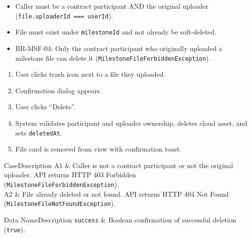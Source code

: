 \begin{itemize}[leftmargin=1.6em,topsep=3pt,itemsep=2pt,parsep=0pt,label=$\bullet$]
      \item Caller must be a contract participant AND the original uploader (\texttt{file.uploaderId === userId}).
      \item File must exist under \texttt{milestoneId} and not already be soft-deleted.
\end{itemize}

\begin{itemize}[leftmargin=1.6em,topsep=3pt,itemsep=2pt,parsep=0pt,label=$\bullet$]\brrulelist
      \item BR-MSF-04: Only the contract participant who originally uploaded a milestone file can delete it (\texttt{MilestoneFileForbiddenException}).
\end{itemize}

\begin{enumerate}[leftmargin=1.8em,topsep=3pt,itemsep=2pt,parsep=0pt]
      \item User clicks trash icon next to a file they uploaded.
      \item Confirmation dialog appears.
      \item User clicks ``Delete''.
      \item System validates participant and uploader ownership, deletes cloud asset, and sets \texttt{deletedAt}.
      \item File card is removed from view with confirmation toast.
\end{enumerate}

\begin{flowtable}{Case}{Description}
      A1 & Caller is not a contract participant or not the original uploader. API returns HTTP 403 Forbidden (\texttt{MilestoneFileForbiddenException}).\\ \hline
      A2 & File already deleted or not found. API returns HTTP 404 Not Found (\texttt{MilestoneFileNotFoundException}).\\ \hline
\end{flowtable}

\begin{specdatatable}{Data Name}{Description}
      \texttt{success} & Boolean confirmation of successful deletion (\texttt{true}).\\ \hline
\end{specdatatable}

